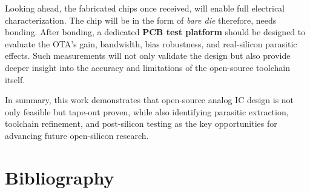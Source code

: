 \documentclass[
  11pt,
  a4paper,
  oneside]{scrbook}
\begin{document}
Looking ahead, the fabricated chips once received, will enable full
electrical characterization. The chip will be in the form of \emph{bare
die} therefore, needs bonding. After bonding, a dedicated \textbf{PCB
test platform} should be designed to evaluate the OTA's gain, bandwidth,
bias robustness, and real-silicon parasitic effects. Such measurements
will not only validate the design but also provide deeper insight into
the accuracy and limitations of the open-source toolchain itself.

In summary, this work demonstrates that open-source analog IC design is
not only feasible but tape-out proven, while also identifying parasitic
extraction, toolchain refinement, and post-silicon testing as the key
opportunities for advancing future open-silicon research.


\chapter*{Bibliography}\label{bibliography}

\end{document}
